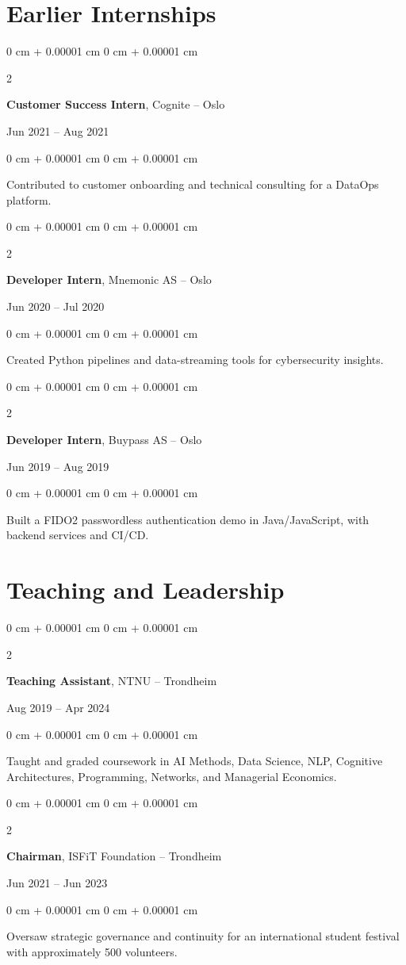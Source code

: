 \documentclass[10pt, letterpaper]{article}
\newenvironment{onecolentry}{
    \begin{adjustwidth}{
        0 cm + 0.00001 cm
    }{
        0 cm + 0.00001 cm
    }
}{
    \end{adjustwidth}
} %
\newenvironment{twocolentry}[2][]{
    \onecolentry
    \def\secondColumn{#2}
    \setcolumnwidth{\fill, 4.5 cm}
    \begin{paracol}{2}
}{
    \switchcolumn \raggedleft \secondColumn
    \end{paracol}
    \endonecolentry
} %
\begin{document}
\section{Earlier Internships}

\begin{twocolentry}{Jun 2021 – Aug 2021}
    \textbf{Customer Success Intern}, Cognite – Oslo
\end{twocolentry}
\begin{onecolentry}
    Contributed to customer onboarding and technical consulting for a DataOps platform.
\end{onecolentry}

\vspace{0.15 cm}
\begin{twocolentry}{Jun 2020 – Jul 2020}
    \textbf{Developer Intern}, Mnemonic AS – Oslo
\end{twocolentry}
\begin{onecolentry}
    Created Python pipelines and data-streaming tools for cybersecurity insights.
\end{onecolentry}

\vspace{0.15 cm}
\begin{twocolentry}{Jun 2019 – Aug 2019}
    \textbf{Developer Intern}, Buypass AS – Oslo
\end{twocolentry}
\begin{onecolentry}
    Built a FIDO2 passwordless authentication demo in Java/JavaScript, with backend services and CI/CD.
\end{onecolentry}

\section{Teaching and Leadership}

\begin{twocolentry}{Aug 2019 – Apr 2024}
    \textbf{Teaching Assistant}, NTNU – Trondheim
\end{twocolentry}
\begin{onecolentry}
    Taught and graded coursework in AI Methods, Data Science, NLP, Cognitive Architectures, Programming, Networks, and Managerial Economics.
\end{onecolentry}

\vspace{0.15 cm}
\begin{twocolentry}{Jun 2021 – Jun 2023}
    \textbf{Chairman}, ISFiT Foundation – Trondheim
\end{twocolentry}
\begin{onecolentry}
    Oversaw strategic governance and continuity for an international student festival with approximately 500 volunteers.
\end{onecolentry}
\end{document}
